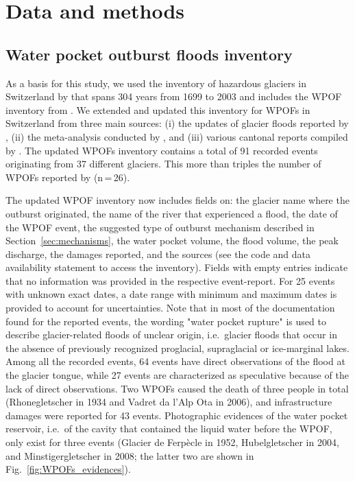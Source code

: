 \section{ Data and methods}


\subsection{ Water pocket outburst floods inventory}

As a basis for this study, we used the inventory of hazardous glaciers in Switzerland by \cite{Raymond&al2003} that spans 304 years from 1699 to 2003 and includes the WPOF inventory from \cite{Haeberli1983}. We extended and updated this inventory for WPOFs in Switzerland from three main sources: (i) the updates of glacier floods reported by \cite{GLAMOS_reports2022}, (ii) the meta-analysis conducted by \cite{Veh&al2022}, and (iii) various cantonal reports compiled by \citet{Lanz2022}. The updated WPOFs inventory contains a total of 91 recorded events originating from 37 different glaciers. This more than triples the number of WPOFs reported by \citet{Haeberli1983} (n\,=\,26). 

The updated WPOF inventory now includes fields on: the glacier name where the outburst originated, the name of the river that experienced a flood, the date of the WPOF event, the suggested type of outburst mechanism described in Section~\ref{sec:mechanisms}, the water pocket volume, the flood volume, the peak discharge, the damages reported, and the sources (see the code and data availability statement to access the inventory). Fields with empty entries indicate that no information was provided in the respective event-report. For 25 events with unknown exact dates, a date range with minimum and maximum dates is provided to account for uncertainties. Note that in most of the documentation found for the reported events, the wording "water pocket rupture" is used to describe glacier-related floods of unclear origin, i.e.\ glacier floods that occur in the absence of previously recognized proglacial, supraglacial or ice-marginal lakes. Among all the recorded events, 64 events have direct observations of the flood at the glacier tongue, while 27 events are characterized as speculative because of the lack of direct observations. Two WPOFs caused the death of three people in total (Rhonegletscher in 1934 and Vadret da l'Alp Ota in 2006), and infrastructure damages were reported for 43 events. Photographic evidences of the water pocket reservoir, i.e.\ of the cavity that contained the liquid water before the WPOF, only exist for three events (Glacier de Ferpècle in 1952, Hubelgletscher in 2004, and Minstigergletscher in 2008; the latter two are shown in Fig.~\ref{fig:WPOFs_evidences}).

